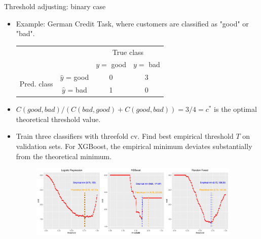 \documentclass[11pt,compress,t,notes=noshow, xcolor=table]{beamer}
\begin{document}
\begin{vbframe}{Threshold adjusting: binary case}
    \footnotesize 
    \begin{itemize}
        \scriptsize
        \item Example: German Credit Task, where customers are classified as "good" or "bad".
        \begin{center}
                            \begin{tabular}{cc|cc}
        			& &\multicolumn{2}{c}{True class} \\
        			& & $y=$ good & $y=$ bad  \\
        			\hline
        			\multirow{2}{*}{\parbox{0.3cm}{Pred.  class}} & $\hat y$ = good & 0 & 3 \\
        			& $\hat y$ = bad & 1 & 0\\
                \end{tabular}
        \end{center}
        \item $C(good,bad)/(C(bad,good)+C(good,bad))=3/4=c^{*}$ is the optimal theoretical threshold value.

        \item Train three classifiers with threefold cv. Find best empirical threshold $T$ on validation sets. For XGBoost, the empirical minimum deviates substantially from the theoretical minimum.

                \begin{figure}[h]
            \centering
            \includegraphics[width=0.95\textwidth]{slides/imbalanced-learning/figure_man/cost_curves_plot.png}
        \end{figure}

    \end{itemize}
\end{vbframe}
\end{document}
